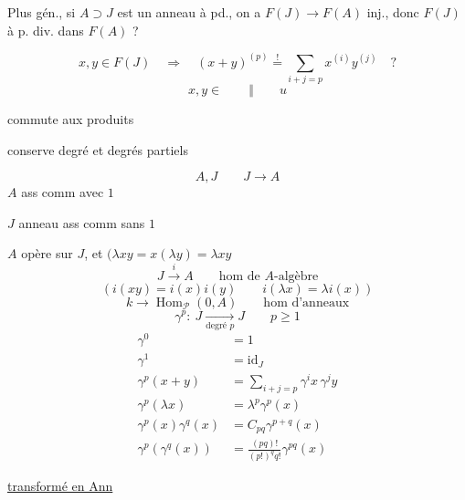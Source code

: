 
Plus gén., si $A\supset J$ est un anneau à pd., on a $F(J)\longrightarrow F(A)$ inj., donc $F(J)$ à p. div. dans $F(A)$ ?


\[
x,y\in F(J)\quad\Longrightarrow\quad
(x+y)^{(p)}\overset{!}{=}\sum_{i+j=p}x^{(i)}y^{(j)}\quad?
\]
\[x,y\in\qquad\Vert\qquad u\]

commute aux produits\par
conserve degré et degrés partiels

\[
A,J\qquad J\longrightarrow A
\]
$A$   ass comm avec $1$\par
$J$ anneau ass comm sans $1$\par
$A$ opère sur $J$, et $(\lambda xy=x(\lambda y)=\lambda xy$
\[
J\xrightarrow{i} A\qquad\text{hom de }A\text{-}\text{algèbre}
\]
\[
(i(xy)=i(x)i(y)\qquad i(\lambda x)=\lambda i(x))
\]
\[
k\longrightarrow\operatorname{Hom}_{\mathcal P}(0,A)\qquad\text{hom d'anneaux}
\]
\[
\gamma^p:\ J\xrightarrow[\text{degré }p]{}J\qquad p\geq1
\]
\[
\begin{aligned}
\gamma^0&=1\\
\gamma^1&=\mathrm{id}_J\\
\gamma^p(x+y)&=\sum_{i+j=p}\gamma^i x\,\gamma^j y\\
\gamma^p(\lambda x)&=\lambda^p\gamma^p(x)\\
\gamma^p(x)\gamma^q(x)&=C_{pq}\gamma^{p+q}(x)\\
\gamma^p(\gamma^q(x))&=\frac{(pq)!}{(p!)^q q!}\gamma^{pq}(x)
\end{aligned}
\]

\uline{transformé en Ann}

